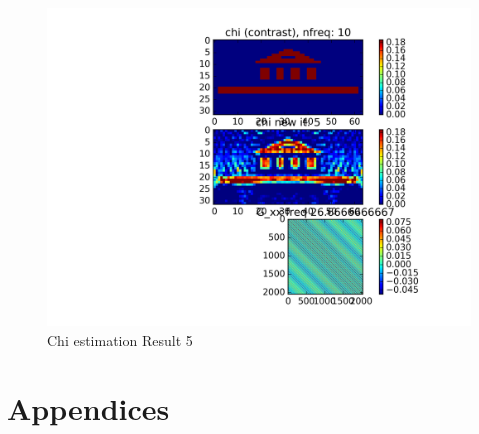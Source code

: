 \documentclass[10pt,a4paper]{article}
\begin{document}
\begin{figure}
\centering
 \includegraphics[scale=0.75]{Chi_est_it04.png}
  \caption{Chi estimation Result 5}
  \label{fig:fig8}
\end{figure}

\clearpage

\section{Appendices}
\end{document}

